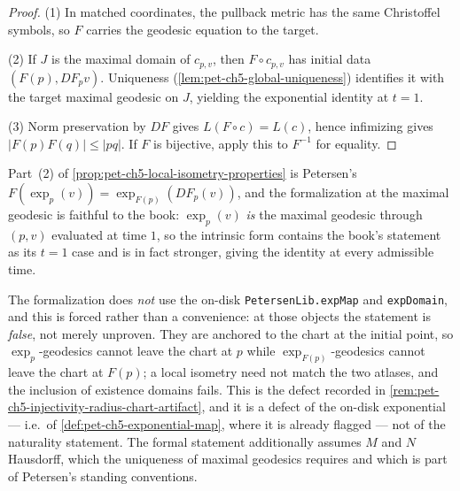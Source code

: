 \begin{proof}
  \leanok
  \sketch
  (1) In matched coordinates, the pullback metric has the same Christoffel symbols,
  so $F$ carries the geodesic equation to the target.

  (2) If $J$ is the maximal domain of $c_{p,v}$, then $F\circ c_{p,v}$ has initial
  data $(F(p),DF_pv)$.  Uniqueness
  (\cref{lem:pet-ch5-global-uniqueness}) identifies it with the target maximal
  geodesic on $J$, yielding the exponential identity at $t=1$.

  (3) Norm preservation by $DF$ gives $L(F\circ c)=L(c)$, hence infimizing gives
  $|F(p)F(q)|\le|pq|$.  If $F$ is bijective, apply this to $F^{-1}$ for equality.
\end{proof}

\begin{remark}
  \label{rem:pet-ch5-exp-naturality-intrinsic}
  Part~(2) of \cref{prop:pet-ch5-local-isometry-properties} is Petersen's
  $F(\exp_p(v))=\exp_{F(p)}(DF_p(v))$, and the formalization at the maximal
  geodesic is faithful to the book: $\exp_p(v)$ \emph{is} the maximal geodesic
  through $(p,v)$ evaluated at time $1$, so the intrinsic form contains the book's
  statement as its $t=1$ case and is in fact stronger, giving the identity at every
  admissible time.

  The formalization does \emph{not} use the on-disk \texttt{PetersenLib.expMap} and
  \texttt{expDomain}, and this is forced rather than a convenience: at those objects
  the statement is \emph{false}, not merely unproven. They are anchored to the chart
  at the initial point, so $\exp_p$-geodesics cannot leave the chart at $p$ while
  $\exp_{F(p)}$-geodesics cannot leave the chart at $F(p)$; a local isometry need
  not match the two atlases, and the inclusion of existence domains fails. This is
  the defect recorded in \cref{rem:pet-ch5-injectivity-radius-chart-artifact}, and
  it is a defect of the on-disk exponential — i.e.\ of
  \cref{def:pet-ch5-exponential-map}, where it is already flagged — not of the
  naturality statement. The formal statement additionally assumes $M$ and $N$
  Hausdorff, which the uniqueness of maximal geodesics requires and which is part of
  Petersen's standing conventions.
\end{remark}

